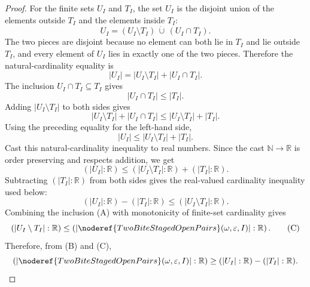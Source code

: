 \begin{proof}
For the finite sets \(U_I\) and \(T_I\), the set \(U_I\) is the disjoint union
of the elements outside \(T_I\) and the elements inside \(T_I\):
\[
U_I=(U_I\setminus T_I)\,\dot\cup\,(U_I\cap T_I).
\]
The two pieces are disjoint because no element can both lie in \(T_I\) and lie
outside \(T_I\), and every element of \(U_I\) lies in exactly one of the two
pieces.  Therefore the natural-cardinality equality is
\[
|U_I|=|U_I\setminus T_I|+|U_I\cap T_I|.
\]
The inclusion \(U_I\cap T_I\subseteq T_I\) gives
\[
|U_I\cap T_I|\le |T_I|.
\]
Adding \(|U_I\setminus T_I|\) to both sides gives
\[
|U_I\setminus T_I|+|U_I\cap T_I|
\le |U_I\setminus T_I|+|T_I|.
\]
Using the preceding equality for the left-hand side,
\[
|U_I|\le |U_I\setminus T_I|+|T_I|.
\]
Cast this natural-cardinality inequality to real numbers.  Since the cast
\(\mathbb N\to\mathbb R\) is order preserving and respects addition, we get
\[
(|U_I|:\mathbb R)
\le (|U_I\setminus T_I|:\mathbb R)+(|T_I|:\mathbb R).
\]
Subtracting \((|T_I|:\mathbb R)\) from both sides gives the real-valued
cardinality inequality used below:
\[
(|U_I|:\mathbb R)-(|T_I|:\mathbb R)
\le (|U_I\setminus T_I|:\mathbb R).
\tag{B}
\]
Combining the inclusion (A) with monotonicity of finite-set cardinality gives
\[
(|U_I\setminus T_I|:\mathbb R)
\le
\left(\left|\noderef{TwoBiteStagedOpenPairs}(\omega,\varepsilon,I)\right|:
\mathbb R\right).
\tag{C}
\]
Therefore, from (B) and (C),
\[
\left(\left|\noderef{TwoBiteStagedOpenPairs}(\omega,\varepsilon,I)\right|:
\mathbb R\right)
\ge (|U_I|:\mathbb R)-(|T_I|:\mathbb R).
\]


\end{proof}
